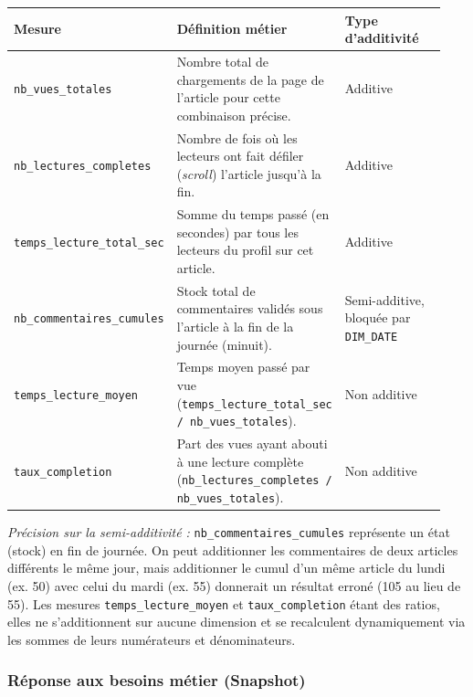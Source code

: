 \documentclass[a4paper,12pt]{article}
\begin{document}
\begin{center}
\renewcommand{\arraystretch}{1.3}
\begin{tabular}{@{}p{0.28\linewidth}p{0.38\linewidth}p{0.28\linewidth}@{}}
  \toprule
  \textbf{Mesure} & \textbf{Définition métier} & \textbf{Type d'additivité} \\
  \midrule
  \texttt{nb\_vues\_totales} & Nombre total de chargements de la page de l'article pour cette combinaison précise. & Additive \\
  \texttt{nb\_lectures\_completes} & Nombre de fois où les lecteurs ont fait défiler (\emph{scroll}) l'article jusqu'à la fin. & Additive \\
  \texttt{temps\_lecture\_total\_sec} & Somme du temps passé (en secondes) par tous les lecteurs du profil sur cet article. & Additive \\
  \texttt{nb\_commentaires\_cumules} & Stock total de commentaires validés sous l'article à la fin de la journée (minuit). & Semi-additive, bloquée par \texttt{DIM\_DATE} \\
  \texttt{temps\_lecture\_moyen} & Temps moyen passé par vue (\texttt{temps\_lecture\_total\_sec / nb\_vues\_totales}). & Non additive \\
  \texttt{taux\_completion} & Part des vues ayant abouti à une lecture complète (\texttt{nb\_lectures\_completes / nb\_vues\_totales}). & Non additive \\
  \bottomrule
\end{tabular}
\end{center}

\noindent\textit{Précision sur la semi-additivité :} \texttt{nb\_commentaires\_cumules} représente un état (stock) en fin de journée. On peut additionner les commentaires de deux articles différents le même jour, mais additionner le cumul d'un même article du lundi (ex. 50) avec celui du mardi (ex. 55) donnerait un résultat erroné (105 au lieu de 55). Les mesures \texttt{temps\_lecture\_moyen} et \texttt{taux\_completion} étant des ratios, elles ne s'additionnent sur aucune dimension et se recalculent dynamiquement via les sommes de leurs numérateurs et dénominateurs.

\subsubsection*{Réponse aux besoins métier (Snapshot)}
\end{document}
